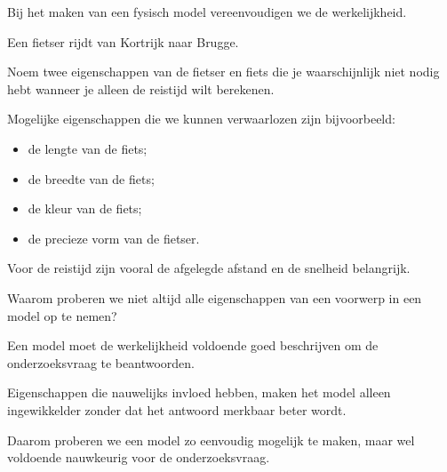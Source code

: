 \documentclass{ximera}
\begin{document}
  \begin{oefening}{\oefB}
  
  Bij het maken van een fysisch model vereenvoudigen we de werkelijkheid.
  
  \begin{question}
  Een fietser rijdt van Kortrijk naar Brugge.
  
  Noem twee eigenschappen van de fietser en fiets die je waarschijnlijk niet
  nodig hebt wanneer je alleen de reistijd wilt berekenen.
  
  \begin{oplossing}
  Mogelijke eigenschappen die we kunnen verwaarlozen zijn bijvoorbeeld:
  
  \begin{itemize}
      \item de lengte van de fiets;
      \item de breedte van de fiets;
      \item de kleur van de fiets;
      \item de precieze vorm van de fietser.
  \end{itemize}
  
  Voor de reistijd zijn vooral de afgelegde afstand en de snelheid belangrijk.
  \end{oplossing}
  \end{question}
  
  
  \begin{question}
  Waarom proberen we niet altijd alle eigenschappen van een voorwerp in een
  model op te nemen?
  
  \begin{oplossing}
  Een model moet de werkelijkheid voldoende goed beschrijven om de
  onderzoeksvraag te beantwoorden.
  
  Eigenschappen die nauwelijks invloed hebben, maken het model alleen
  ingewikkelder zonder dat het antwoord merkbaar beter wordt.
  
  Daarom proberen we een model zo eenvoudig mogelijk te maken, maar wel
  voldoende nauwkeurig voor de onderzoeksvraag.
  \end{oplossing}
  \end{question}
  
  \end{oefening}
  
  
  
\end{document}
